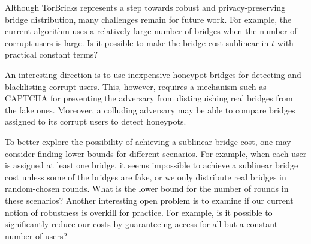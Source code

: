 \documentclass[a4paper,UKenglish]{lipics-v2016}
\newcommand{\bricks}{}
\def\bricks/{\mbox{TorBricks}}
\begin{document}
Although \bricks/ represents a step towards robust and privacy-preserving bridge distribution, many challenges remain for future work. For example, the current algorithm uses a relatively large number of bridges when the number of corrupt users is large. Is it possible to make the bridge cost sublinear in $t$ with practical constant terms? 

An interesting direction is to use inexpensive honeypot bridges for detecting and blacklisting corrupt users. This, however, requires a mechanism such as CAPTCHA for preventing the adversary from distinguishing real bridges from the fake ones. Moreover, a colluding adversary may be able to compare bridges assigned to its corrupt users to detect honeypots.

To better explore the possibility of achieving a sublinear bridge cost, one may consider finding lower bounds for different scenarios. For example, when each user is assigned at least one bridge, it seems impossible to achieve a sublinear bridge cost unless some of the bridges are fake, or we only distribute real bridges in random-chosen rounds. What is the lower bound for the number of rounds in these scenarios?
Another interesting open problem is to examine if our current notion of robustness is overkill for practice. For example, is it possible to significantly reduce our costs by guaranteeing access for all but a constant number of users? %




\appendix
\end{document}
